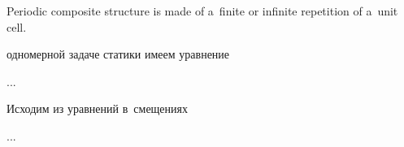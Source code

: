 

\thispagestyle{empty}

\label{chapter:periodiccomposites}

\begin{changemargin}{\parindent}{\parindent}
\vspace{-2.5em}
{\noindent\small

Periodic composite structure is made of a~finite or infinite repetition of a~unit cell.

\par}
\vspace{-1.4em}
\end{changemargin}



\begin{otherlanguage}{russian}

 одномерной задаче статики имеем уравнение

...



\end{otherlanguage}



\begin{otherlanguage}{russian}

Исходим из уравнений в~смещениях

...



\end{otherlanguage}

